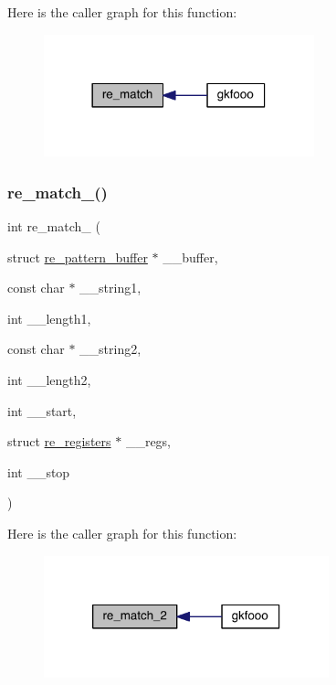 Here is the caller graph for this function\+:\nopagebreak
\begin{figure}[H]
\begin{center}
\leavevmode
\includegraphics[width=222pt]{a00092_af46593d8e7b4996e5c2f2677d6c2c7a9_icgraph}
\end{center}
\end{figure}
\mbox{\label{a00092_af3f6a2d60696d6ae560e91c70edc8b74}} 
\subsubsection{\texorpdfstring{re\+\_\+match\+\_()}{re\_match\_2()}}
{\footnotesize\ttfamily int re\+\_\+match\+\_ (\begin{DoxyParamCaption}\item[{struct \hyperlink{a00686}{re\+\_\+pattern\+\_\+buffer} $\ast$}]{\+\_\+\+\_\+buffer,  }\item[{const char $\ast$}]{\+\_\+\+\_\+string1,  }\item[{int}]{\+\_\+\+\_\+length1,  }\item[{const char $\ast$}]{\+\_\+\+\_\+string2,  }\item[{int}]{\+\_\+\+\_\+length2,  }\item[{int}]{\+\_\+\+\_\+start,  }\item[{struct \hyperlink{a00690}{re\+\_\+registers} $\ast$}]{\+\_\+\+\_\+regs,  }\item[{int}]{\+\_\+\+\_\+stop }\end{DoxyParamCaption})}

Here is the caller graph for this function\+:\nopagebreak
\begin{figure}[H]
\begin{center}
\leavevmode
\includegraphics[width=234pt]{a00092_af3f6a2d60696d6ae560e91c70edc8b74_icgraph}
\end{center}
\end{figure}
\mbox{\label{a00092_a25ace2eeda73683578852e4fb076ffd3}} 
